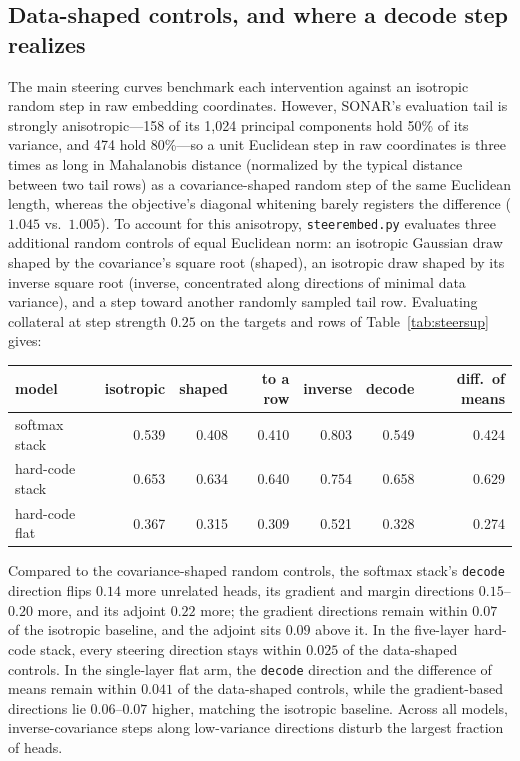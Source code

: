\subsection{Data-shaped controls, and where a decode step realizes}
\label{sec:steernull}

The main steering curves benchmark each intervention against an isotropic
random step in raw embedding coordinates. However, SONAR's evaluation tail
is strongly anisotropic---158 of its 1{,}024 principal components hold
50\% of its variance, and 474 hold 80\%---so a unit Euclidean step in raw
coordinates is three times as long in Mahalanobis distance (normalized by
the typical distance between two tail rows) as a covariance-shaped random
step of the same Euclidean length, whereas the objective's diagonal
whitening barely registers the difference ($1.045$ vs.\ $1.005$). To
account for this anisotropy, \texttt{steerembed.py} evaluates three
additional random controls of equal Euclidean norm: an isotropic Gaussian
draw shaped by the covariance's square root (shaped), an isotropic draw
shaped by its inverse square root (inverse, concentrated along directions
of minimal data variance), and a step toward another randomly sampled
tail row. Evaluating collateral at step strength $0.25$ on the targets
and rows of Table~\ref{tab:steersup} gives:

\begin{center}\small\setlength{\tabcolsep}{4pt}
\begin{tabular}{@{}lrrrrrr@{}}
\toprule
model & isotropic & shaped & to a row & inverse & decode & diff.\ of means \\
\midrule
softmax stack   & 0.539 & 0.408 & 0.410 & 0.803 & 0.549 & 0.424 \\
hard-code stack & 0.653 & 0.634 & 0.640 & 0.754 & 0.658 & 0.629 \\
hard-code flat  & 0.367 & 0.315 & 0.309 & 0.521 & 0.328 & 0.274 \\
\bottomrule
\end{tabular}
\end{center}

Compared to the covariance-shaped random controls, the softmax stack's
\texttt{decode} direction flips $0.14$ more unrelated heads, its gradient
and margin directions $0.15$--$0.20$ more, and its adjoint $0.22$ more; the
gradient directions remain within $0.07$ of the isotropic baseline, and the
adjoint sits $0.09$ above it. In the five-layer
hard-code stack, every steering direction stays within $0.025$ of the
data-shaped controls. In the single-layer flat arm, the \texttt{decode}
direction and the difference of means remain within $0.041$ of the
data-shaped controls, while the gradient-based directions lie
$0.06$--$0.07$ higher, matching the isotropic baseline. Across all models,
inverse-covariance steps along low-variance directions disturb the
largest fraction of heads.


